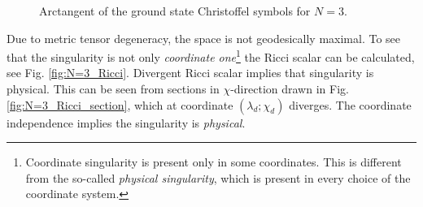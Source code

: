 \vspace{-30pt}
\begin{figure}[H]
    \centering
    \caption{Arctangent of the ground state Christoffel symbols for $N=3$.}
    \label{fig:N=3_G}
\end{figure}


Due to metric tensor degeneracy, the space is not geodesically maximal. To see that the singularity is not only \emph{coordinate one}\footnote{Coordinate singularity is present only in some coordinates. This is different from the so-called \emph{physical singularity}, which is present in every choice of the coordinate system.} the Ricci scalar can be calculated, see Fig. \ref{fig:N=3_Ricci}. Divergent Ricci scalar implies that singularity is physical. This can be seen from sections in $\chi$-direction drawn in Fig. \ref{fig:N=3_Ricci_section}, which at coordinate $(\lambda_d;\chi_d)$ diverges. The coordinate independence implies the singularity is \emph{physical}. 


